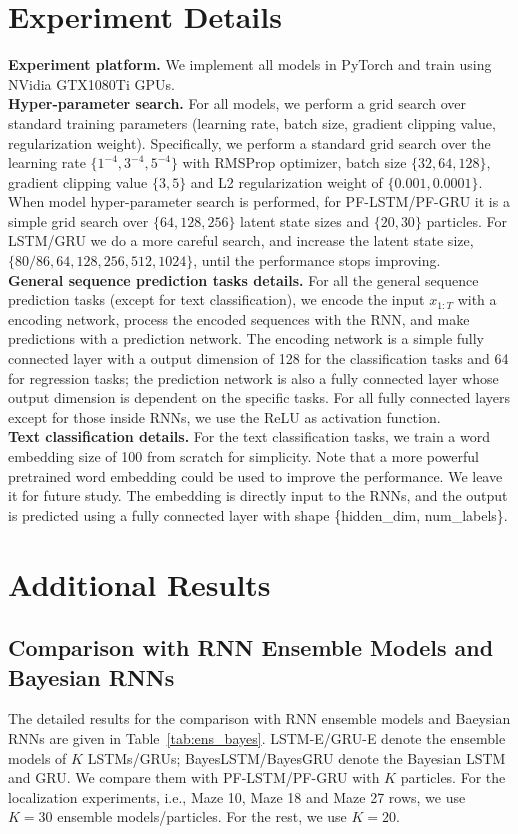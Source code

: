 \documentclass[letterpaper]{article} %
\begin{document}
\section{Experiment Details}
\textbf{Experiment platform.} We implement all models in PyTorch and train using NVidia GTX1080Ti GPUs. \\
\textbf{Hyper-parameter search. } For all models, we perform a grid search over standard training parameters (learning rate, batch size, gradient clipping value, regularization weight). Specifically, we perform a standard grid search over the learning rate $\{1^{-4}, 3^{-4}, 5^{-4}\}$ with RMSProp optimizer, batch size $\{32, 64, 128\}$, gradient clipping value $\{3, 5\}$ and L2 regularization weight of $\{0.001, 0.0001\}$. When model hyper-parameter search is performed,  for PF-LSTM/PF-GRU it is a simple grid search over $\{64, 128, 256\}$ latent state sizes and $\{20, 30\}$ particles. For LSTM/GRU we do a more careful search, and increase the latent state size, $\{80/86, 64, 128, 256, 512, 1024\}$, until the performance stops improving.\\
\textbf{General sequence prediction tasks details.} For all the general sequence prediction tasks (except for text classification), we encode the input $x_{1:T}$ with a encoding network, process the encoded sequences with the RNN, and make predictions with a prediction network. The encoding network is a simple fully connected layer with a output dimension of 128 for the classification tasks and 64 for regression tasks; the prediction network is also a fully connected layer whose output dimension is dependent on the specific tasks. For all fully connected layers except for those inside RNNs, we use the ReLU as activation function.\\
\textbf{Text classification details.} For the text classification tasks, we train a word embedding size of 100 from scratch for simplicity. Note that a more powerful pretrained word embedding could be used to improve the performance. We leave it for future study. The embedding is directly input to the RNNs, and the output is predicted using a fully connected layer with shape \{hidden\_dim, num\_labels\}.\\

\section{Additional Results}\label{sec:aexp}
\subsection{Comparison with RNN Ensemble Models and Bayesian RNNs}
The detailed results for the comparison with RNN ensemble models and Baeysian RNNs are given in Table~\ref{tab:ens_bayes}. LSTM-E/GRU-E denote the ensemble models of $K$ LSTMs/GRUs; BayesLSTM/BayesGRU denote the Bayesian LSTM and GRU. We compare them with PF-LSTM/PF-GRU with $K$ particles. For the localization experiments, i.e., Maze 10, Maze 18 and Maze 27 rows, we use $K=30$ ensemble models/particles. For the rest, we use $K=20$. 
\end{document}
